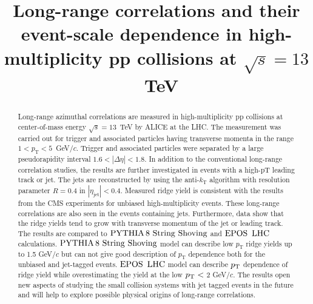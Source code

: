 \documentclass[ALICE,manyauthors]{cernphprep}
\begin{document}
\begin{titlepage}

\PHyear{}
\PHdate{\today}
%

\title{Long-range correlations and their event-scale dependence in high-multiplicity pp collisions at $\sqrt{s} = 13$~TeV}


\begin{abstract}
%

Long-range azimuthal correlations are measured in high-multiplicity pp collisions at center-of-mass energy $\sqrt{s} = 13$~TeV by ALICE at the LHC. The measurement was carried out for trigger and associated particles having transverse momenta in the range $1 < p_{\mathrm T} < 5$~GeV/$c$. Trigger and associated particles were separated by a large pseudorapidity interval $1.6 < |\Delta \eta |<1.8$.
In addition to the conventional long-range correlation studies, the results are further investigated in events with a high-pT leading track or jet.
The jets are reconstructed by using the anti-$k_\mathrm{T}$ algorithm with resolution parameter $R=0.4$ in $|\eta_\mathrm{jet}|<0.4$. 
Measured ridge yield is consistent with the results from the CMS experiments for unbiased high-multiplicity events.
These long-range correlations are also seen in the events containing jets. Furthermore, data show that the ridge yields tend to grow with transverse momentum of the jet or leading track. %
The results are compared to ${\mathrm{PYTHIA}\,8~\mathrm{String}~}\mathrm{Shoving}$ and ${\mathrm{EPOS}\,~\mathrm{LHC}}$ calculations.  
${\mathrm{PYTHIA}\,8~\mathrm{String}~}\mathrm{Shoving}$ model can describe low $p_{\mathrm T}$ ridge yields up to 1.5 GeV/$c$ but can not give good description of $p_{\mathrm T}$ dependence both for the unbiased and jet-tagged events. ${\mathrm{EPOS}\,~\mathrm{LHC}}$ model can describe $p_\mathrm{T}$ dependence of ridge yield while overestimating the yield at the low $p_\mathrm{T}<$ 2 GeV/$c$.
The results open new aspects of studying the small collision systems with jet tagged events in the future and will help to explore possible physical origins of long-range correlations.

\end{abstract}

\end{titlepage}
\end{document}
